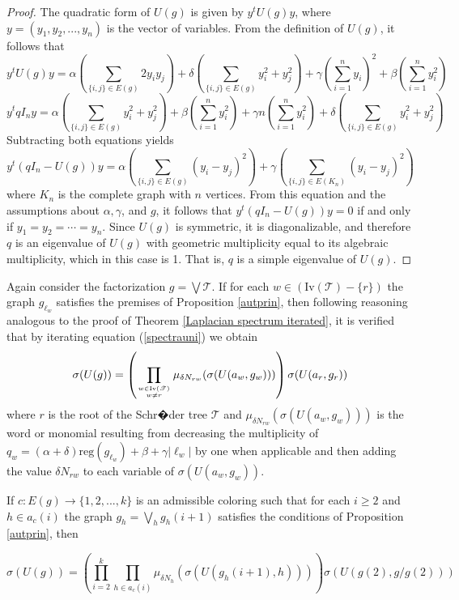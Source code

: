 \documentclass[11pt]{article}
\theoremstyle{definition}
\begin{document}
\begin{proof}
The quadratic form of $U(g)$ is given by $y^t U(g) y$, where $y=(y_1, y_2,..., y_n)$ is the vector of variables. From the definition of $U(g)$, it follows that
\[y^t U(g) y=\alpha\left(\sum_{\{i,j\}\in E(g)}2y_iy_j\right)+\delta\left(\sum_{\{i, j\}\in E(g)}y^2_i+y^2_j\right)+\gamma\left(\sum^n_{i=1}y_i\right)^2 +\beta \left(\sum^n_{i=1} y^2_i\right)\]
\[y^t qI_n y = \alpha\left(\sum_{\{i, j\}\in E(g)} y^2_i + y^2_j\right) + \beta \left(\sum^n_{i=1} y^2_i\right) +\gamma n \left(\sum^n_{i=1} y^2_i\right) + \delta \left(\sum_{\{i, j\}\in E(g)} y^2_i + y^2_j\right)\]
Subtracting both equations yields
\[y^t (qI_n-U(g)) y=\alpha\left(\sum_{\{i, j\}\in E(g)} (y_i - y_j)^2\right) + \gamma\left(\sum_{\{i, j\}\in E(K_n)} (y_i - y_j)^2\right)\]
where $K_n$ is the complete graph with $n$ vertices. From this equation and the assumptions about $\alpha, \gamma$, and $g$, it follows that $y^t(qI_n-U(g))y=0$ if and only if $y_1=y_2=\cdots =y_n$. Since $U(g)$ is symmetric, it is diagonalizable, and therefore $q$ is an eigenvalue of $U(g)$ with geometric multiplicity equal to its algebraic multiplicity, which in this case is 1. That is, $q$ is a simple eigenvalue of $U(g)$.
\end{proof}

Again consider the factorization $g=\bigvee \mathscr{T}$. If for each $w\in (\mathrm{Iv}(\mathscr{T})-\{r\})$ the graph $g_{\ell_w}$ satisfies the premises of Proposition \ref{autprin}, then following reasoning analogous to the proof of Theorem \ref{Laplacian spectrum iterated}, it is verified that by iterating equation (\ref{spectrauni}) we obtain
\begin{equation}
\sigma(U(g))=\left(\prod_{w\in \mathrm{Iv}(\mathscr{T})\atop w\neq r} \mu_{\delta N_{rw}}(\sigma(U(a_w, g_w)))\right)\sigma(U(a_r, g_r))
\end{equation}
where $r$ is the root of the Schr�der tree $\mathscr{T}$ and $\mu_{\delta N_{rw}}(\sigma(U(a_w, g_w)))$ is the word or monomial resulting from decreasing the multiplicity of $q_w=(\alpha+\delta)\mathrm{reg}(g_{\ell_w})+\beta+\gamma |\ell_w|$ by one when applicable and then adding the value $\delta N_{rw}$ to each variable of $\sigma(U(a_w, g_w))$.

If $c:E(g)\longrightarrow \{1, 2,..., k\}$ is an admissible coloring such that for each $i\geq2$ and $h\in a_c(i)$ the graph $g_h=\displaystyle{\bigvee_h g_h(i+1)}$ satisfies the conditions of Proposition \ref{autprin}, then

\begin{equation}
\sigma(U(g))=\left(\prod^k_{i=2}\prod_{h\in a_c(i)} \mu_{\delta N_h}(\sigma(U(g_h(i+1), h)))\right)\sigma(U(g(2), g/g(2)))
\end{equation}
\end{document}
